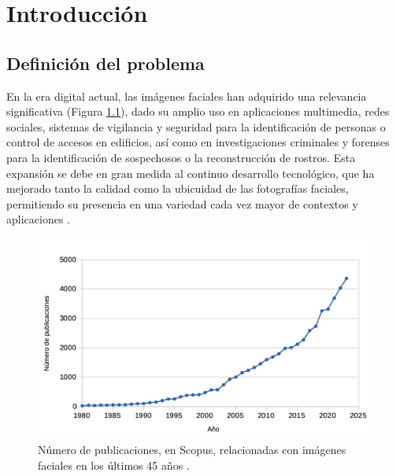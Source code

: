 \chapter{Introducción}
\thispagestyle{empty}

\section{Definición del problema}

En la era digital actual, las imágenes faciales han adquirido una relevancia significativa (Figura \ref{fig1}), dado su amplio uso  en aplicaciones multimedia, redes sociales, sistemas de vigilancia y seguridad para la identificación de personas o control de accesos en edificios, así como en investigaciones criminales y forenses para la identificación de sospechosos o la reconstrucción de rostros.
Esta expansión se debe en gran medida al continuo desarrollo tecnológico, que ha mejorado tanto la calidad como la ubicuidad de las fotografías faciales, permitiendo su presencia en una variedad cada vez mayor de contextos y aplicaciones \cite{74,75,76,77}.

\renewcommand{\thefootnote}{1}

\begin{figure}[h]
	\centering
	\includegraphics[scale=0.6]{imagenes/cap1/tabla_facial_images.png}
	\caption[Número de publicaciones de imágenes faciales.]{Número de publicaciones, en Scopus, relacionadas con imágenes faciales en los últimos 45 años \protect\footnotemark.}
	\label{fig1}
\end{figure}


\renewcommand{\thefootnote}{\arabic{footnote}}
\setcounter{footnote}{2}

